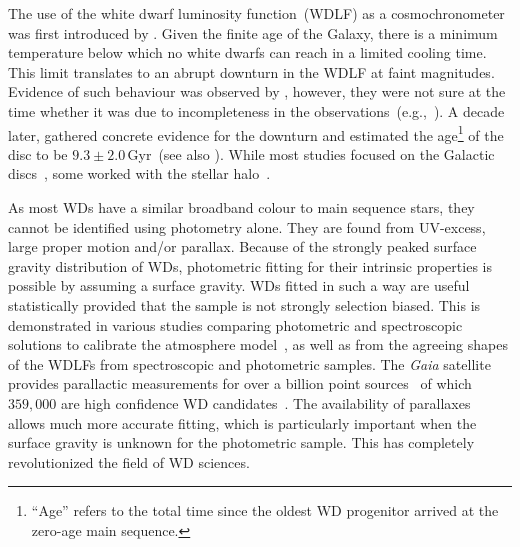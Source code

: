 \documentclass[fleqn,usenatbib]{mnras}
\begin{document}
The use of the white dwarf luminosity function~(WDLF) as a cosmochronometer was
first introduced by \citet{1959ApJ...129..243S}. Given the finite age of the
Galaxy, there is a minimum temperature below which no white dwarfs can reach in
a limited cooling time. This limit translates to an abrupt downturn in the WDLF
at faint magnitudes. Evidence of such behaviour was observed by
\citet{1979ApJ...233..226L}, however, they were not sure at the time whether it
was due to incompleteness in the observations~(e.g.,~\citealp{1984ApJ...282..615I}). A decade later,
\citet{1987ApJ...315L..77W} gathered concrete evidence for the downturn and
estimated the age\footnote{``Age'' refers to the total time since the oldest
WD progenitor arrived at the zero-age main sequence.} of the disc to be
$9.3 \pm 2.0$\,Gyr~(see also \citealt{1988ApJ...332..891L}). While most studies
focused on the Galactic discs~\citep{1989LNP...328...15L, 1992ApJ...386..539W,
1995LNP...443...24O, 1998ApJ...497..294L, 1999MNRAS.306..736K,
2012ApJS..199...29G, 2021A&A...649A...6G}, some worked with the stellar
halo~\citep{2006AJ....131..571H, 2011MNRAS.417...93R, 2017AJ....153...10M,
2019MNRAS.482..715L, 2021MNRAS.502.1753T}.
 
As most WDs have a similar broadband colour to main sequence stars, they cannot be
identified using photometry alone. They are found from UV-excess, large
proper motion and/or parallax. Because of the strongly peaked surface gravity
distribution of WDs, photometric fitting for their intrinsic properties
is possible by assuming a surface gravity. WDs fitted in such a way are useful
statistically provided that the sample is not strongly selection biased. This
is demonstrated in various studies comparing photometric and spectroscopic
solutions to calibrate the atmosphere
model~\citep{2019ApJ...871..169G, 2019ApJ...882..106G}, as well as from the
agreeing shapes of the WDLFs from spectroscopic and photometric samples. The
\textit{Gaia} satellite provides parallactic measurements for over a billion point
sources~\citep{2021A&A...649A...1G, 2021AJ....161..147B} of which $359,000$
are high confidence WD candidates~\citep[][hereafter, GF21]{2021MNRAS.508.3877G}.
The availability of parallaxes allows much more accurate fitting, which is
particularly important when the surface gravity is unknown for the photometric
sample. This has completely revolutionized the field of WD sciences. 
\end{document}
